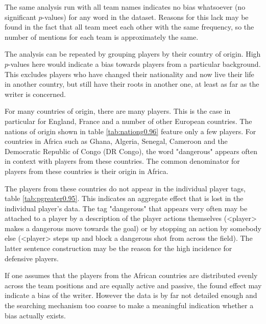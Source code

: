 \documentclass[10pt, a4paper]{UUThesisTemplate}
\begin{document}
The same analysis run with all team names indicates no bias whatsoever (no significant $p$-values) for any word in the dataset. Reasons for this lack may be found in the fact that all team meet each other with the same frequency, so the number of mentions for each team is approximately the same. 

The analysis can be repeated by grouping players by their country of origin. High $p$-values here would indicate a bias towards players from a particular background. This excludes players who have changed their nationality and now live their life in another country, but still have their roots in another one, at least as far as the writer is concerned.

For many countries of origin, there are many players. This is the case in particular for England, France and a number of other European countries. The nations of origin shown in table \ref{tab:nationg0.96} feature only a few players. For countries in Africa such as Ghana, Algeria, Senegal, Cameroon and the Democratic Republic of Congo (DR Congo), the word "dangerous" appears often in context with players from these countries. The common denominator for players from these countries is their origin in Africa.

The players from these countries do not appear in the individual player tags, table \ref{tab:pgreater0.95}. This indicates an aggregate effect that is lost in the individual player's data. The tag "dangerous" that appears very often may be attached to a player by a description of the player actions themselves (<player> makes a dangerous move towards the goal) or by stopping an action by somebody else (<player> steps up and block a dangerous shot from across the field). The latter sentence construction may be the reason for the high incidence for defensive players. 

If one assumes that the players from the African countries are distributed evenly across the team positions and are equally active and passive, the found effect may indicate a bias of the writer. However the data is by far not detailed enough and the searching mechanism too coarse to make a meaningful indication whether a bias actually exists.
\end{document}
